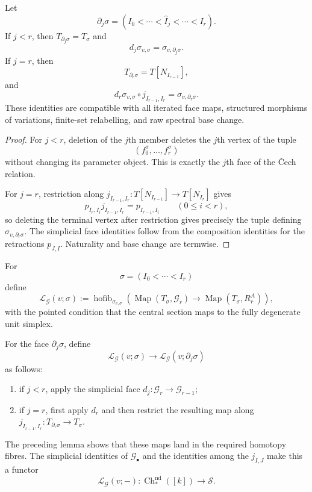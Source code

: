 \begin{lemma}
\label{lem:symmetry-noether-face-compatibility-of-the-relation-simplices}
Let
\[
\partial_j\sigma
=
(I_0<\cdots<\widehat I_j<\cdots<I_r).
\]
If $j<r$, then $T_{\partial_j\sigma}=T_\sigma$ and
\[
d_j\sigma_{v,\sigma}
=
\sigma_{v,\partial_j\sigma}.
\]
If $j=r$, then
\[
T_{\partial_r\sigma}=T[N_{I_{r-1}}],
\]
and
\[
\boxed{
d_r\sigma_{v,\sigma}\circ j_{I_{r-1},I_r}
=
\sigma_{v,\partial_r\sigma}.
}
\]
These identities are compatible with all iterated face maps, structured morphisms
of variations, finite-set relabelling, and raw spectral base change.
\end{lemma}

\begin{proof}
For $j<r$, deletion of the $j$th member deletes the $j$th vertex of the tuple
\[
(f_0^\sigma,\ldots,f_r^\sigma)
\]
without changing its parameter object.  This is exactly the $j$th face of the
\v{C}ech relation.

For $j=r$, restriction along
$j_{I_{r-1},I_r}:T[N_{I_{r-1}}]\to T[N_{I_r}]$ gives
\[
p_{I_r,I_i}j_{I_{r-1},I_r}
=
p_{I_{r-1},I_i}
\qquad
(0\le i<r),
\]
so deleting the terminal vertex after restriction gives precisely the tuple
defining $\sigma_{v,\partial_r\sigma}$.  The simplicial face identities follow
from the composition identities for the retractions $p_{J,I}$.  Naturality and
base change are termwise.
\end{proof}

\begin{construction}
\label{constr:symmetry-noether-face-functor-of-symmetry-lift-spaces}
For
\[
\sigma=(I_0<\cdots<I_r)
\]
define
\[
\mathcal L_{\mathcal G}(v;\sigma)
:=
\operatorname{hofib}_{\sigma_{v,\sigma}}
\left(
\operatorname{Map}(T_\sigma,\mathcal G_r)
\longrightarrow
\operatorname{Map}(T_\sigma,R^A_r)
\right),
\]
with the pointed condition that the central section maps to the fully degenerate
unit simplex.

For the face $\partial_j\sigma$, define
\[
\mathcal L_{\mathcal G}(v;\sigma)
\longrightarrow
\mathcal L_{\mathcal G}(v;\partial_j\sigma)
\]
as follows:
\begin{enumerate}
\item if $j<r$, apply the simplicial face
      $d_j:\mathcal G_r\to\mathcal G_{r-1}$;
\item if $j=r$, first apply $d_r$ and then restrict the resulting map along
      $j_{I_{r-1},I_r}:T_{\partial_r\sigma}\to T_\sigma$.
\end{enumerate}
The preceding lemma shows that these maps land in the required homotopy fibres.
The simplicial identities of $\mathcal G_\bullet$ and the identities among the
$j_{I,J}$ make this a functor
\[
\mathcal L_{\mathcal G}(v;-):
\operatorname{Ch}^{\mathrm{nd}}_*([k])
\longrightarrow
\mathcal S.
\]
\end{construction}

